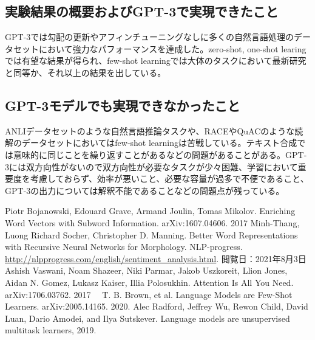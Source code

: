 \documentclass[a4j,11pt]{jarticle}
\begin{document}
\subsection*{実験結果の概要およびGPT-3で実現できたこと}
GPT-3では勾配の更新やアフィンチューニングなしに多くの自然言語処理のデータセットにおいて強力なパフォーマンスを達成した。zero-shot, one-shot learingでは有望な結果が得られ、few-shot learningでは大体のタスクにおいて最新研究と同等か、それ以上の結果を出している。

\subsection*{GPT-3モデルでも実現できなかったこと}
ANLIデータセットのような自然言語推論タスクや、RACEやQuACのような読解のデータセットにおいてはfew-shot learningは苦戦している。テキスト合成では意味的に同じことを繰り返すことがあるなどの問題があることがある。GPT-3には双方向性がないので双方向性が必要なタスクが少々困難、学習において重要度を考慮しておらず、効率が悪いこと、必要な容量が過多で不便であること、GPT-3の出力については解釈不能であることなどの問題点が残っている。

\newpage
\begin{thebibliography}{99}
     Piotr Bojanowski, Edouard Grave, Armand Joulin, Tomas Mikolov. Enriching Word Vectors with Subword Information. arXiv:1607.04606. 2017
     Minh-Thang, Luong Richard Socher, Christopher D. Manning. Better Word Representations with Recursive Neural Networks for Morphology.
     NLP-progress. \url{http://nlpprogress.com/english/sentiment_analysis.html}. 閲覧日：2021年8月3日
     Ashish Vaswani, Noam Shazeer, Niki Parmar, Jakob Uszkoreit, Llion Jones, Aidan N. Gomez, Lukasz Kaiser, Illia Polosukhin. Attention Is All You Need. arXiv:1706.03762. 2017
    　T. B. Brown, et al. Language Models are Few-Shot Learners. arXiv:2005.14165.
    2020.
     Alec Radford, Jeffrey Wu, Rewon Child, David Luan, Dario Amodei, and Ilya Sutskever. Language
    models are unsupervised multitask learners, 2019.
    \bibitem{}
    \bibitem{}
    \bibitem{}
    \bibitem{}
    \bibitem{}

\end{thebibliography}
\end{document}
